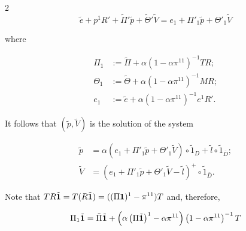 \begin{multicols}{2}
$$

\tilde e+p^1R'+\tilde \Pi'\tilde p +\tilde \Theta'\tilde V=e_1 +  \Pi'_1 \tilde p + \Theta'_1 \tilde V

$$

where 



\vspace*{-4pt}



\noindent

\begin{align*}

\Pi_1 &:= \tilde \Pi + \alpha\left(1 - \alpha \pi^{11}\right)^{-1}  TR; \\

\Theta_1 &:= \tilde \Theta + \alpha\left(1 - \alpha \pi^{11}\right)^{-1}  MR; \\ 

e_1 &:= \tilde e + \alpha\left(1 - \alpha \pi^{11}\right)^{-1}  e^1 R'.

\end{align*}



\vspace*{-4pt}



\noindent

It follows that $(\tilde p,\tilde V)$ is the solution of the system  

\begin{align*}

\tilde p&=\alpha\left(e_1 +  \Pi'_1 \tilde p + \Theta'_1 \tilde V\right) \circ \tilde 1_{D} + \tilde l \circ \tilde 1_{\bar D}; \\

\tilde V&= \left(e_1 + \Pi'_1 \tilde p + \Theta'_1 \tilde V - \tilde l\right)^+ \circ \tilde 1_{\bar D}.  

\end{align*}



Note that $TR \tilde {\bf 1} = T (R \tilde {\bf 1}) = ((\Pi{\bf 1})^1 - \pi^{11}) T$  and, therefore,   

\begin{multline*}

\Pi_1\tilde {\bf 1}=\tilde \Pi \tilde {\bf 1} + 

\left(\alpha \left(\Pi\tilde {\bf 1}\right)^1 - \alpha \pi^{11}\right) 

\left(1 -\alpha \pi^{11}\right)^{-1} T \\


\end{multline*}
\end{multicols}
